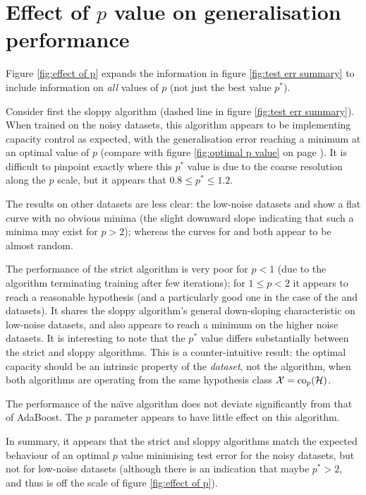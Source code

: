 \section{Effect of $p$ value on generalisation performance}

Figure \ref{fig:effect of p} expands the information in figure
\ref{fig:test err summary} to include information on \emph{all} values
of $p$ (not just the best value $p^{\ast}$).

Consider first the sloppy algorithm (dashed line in figure
\ref{fig:test err summary}).  When trained on the noisy 
datasets, this algorithm appears to be implementing capacity control
as expected, with the generalisation error reaching a minimum at an
optimal value of $p$ (compare with figure \ref{fig:optimal p value} on
page \pageref{fig:optimal p value}).  It is difficult to pinpoint
exactly where this $p^{\ast}$ value is due to the coarse resolution
along the $p$ scale, but it appears that $0.8 \leq p^{\ast} \leq 1.2$.

The results on other datasets are less clear: the low-noise datasets
 and  show a flat curve with no obvious minima
(the slight downward slope indicating that such a minima may exist for
$p > 2$); whereas the curves for  and  both appear
to be almost random.

The performance of the strict algorithm is very poor for $p < 1$ (due
to the algorithm terminating training after few iterations); for $1
\leq p < 2$ it appears to reach a reasonable hypothesis (and a
particularly good one in the case of the  and 
datasets).  It shares the sloppy algorithm's general down-sloping
characteristic on low-noise datasets, and also appears to reach a
minimum on the higher noise datasets.  It is interesting to note that
the $p^{\ast}$ value differs substantially between the strict and
sloppy algorithms.  This is a counter-intuitive result: the optimal
capacity should be an intrinsic property of the \emph{dataset}, not
the algorithm, when both algorithms are operating from the same
hypothesis class $\mathcal{X} = \mathrm{co}_p(\mathcal{H})$.

The performance of the na\"{\i}ve algorithm does not deviate
significantly from that of AdaBoost.  The $p$ parameter appears to
have little effect on this algorithm.

In summary, it appears that the strict and sloppy algorithms match the
expected behaviour of an optimal $p$ value minimising test error for
the noisy datasets, but not for low-noise datasets (although there is
an indication that maybe $p^{\ast} > 2$, and thus is off the scale of
figure \ref{fig:effect of p}).

